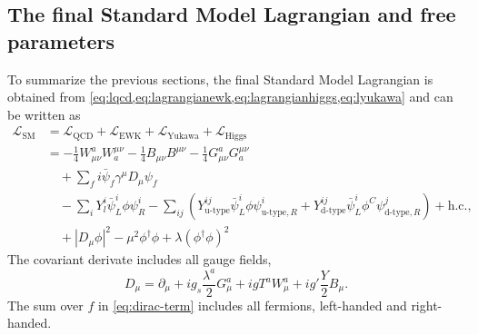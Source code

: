 \subsection{The final Standard Model Lagrangian and free parameters}
\label{subsec:final-lagrangian}
To summarize the previous sections, the final Standard Model Lagrangian is obtained from \cref{eq:lqcd,eq:lagrangianewk,eq:lagrangianhiggs,eq:lyukawa} and can be written as
\begin{align}
  \mathcal{L}_\text{SM} &= \mathcal{L}_\text{QCD} + \mathcal{L}_\text{EWK} + \mathcal{L}_\text{Yukawa} + \mathcal{L}_\text{Higgs} \\
   &= - \frac{1}{4}W_{\mu\nu}^aW^{\mu\nu}_{a} - \frac{1}{4} B_{\mu\nu}B^{\mu\nu} - \frac{1}{4}G_{\mu\nu}^aG^{\mu\nu}_{a} \\
   \label{eq:dirac-term}
   & \quad + \sum_f i \bar{\psi}_f\gamma^\mu D_\mu\psi_f \\
   & \quad - \sum_{i} Y_l^i \bar{\psi}^{i}_{L} \phi \psi^{i}_{R} - \sum_{ij} \left( Y_{\text{u-type}}^{ij} \bar{\psi}^{i}_{L} \phi \psi^{i}_{\text{u-type},R} + Y_{\text{d-type}}^{ij} \bar{\psi}^{i}_{L} \phi^C \psi^{j}_{\text{d-type}, R} \right) + \text{h.c.},  \\
   & \quad + |D_\mu\phi|^2 - \mu^2\phi^\dagger\phi + \lambda \left(\phi^\dagger\phi \right)^2
\end{align}
The covariant derivate includes all gauge fields,
\begin{equation}
  D_\mu = \partial_\mu + i g_s \frac{\lambda^a}{2} G_\mu^a + igT^aW_\mu^a + ig'\frac{Y}{2}B_\mu.
\end{equation}
The sum over $f$ in \cref{eq:dirac-term} includes all fermions, left-handed and right-handed.

